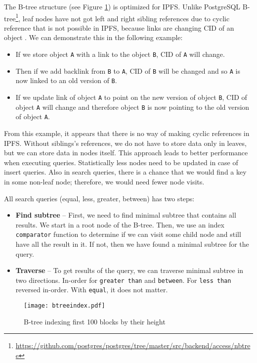 The B-tree structure (see Figure \ref{btree}) is optimized for IPFS. Unlike PostgreSQL B-tree\footnote{\url{https://github.com/postgres/postgres/tree/master/src/backend/access/nbtree}}, leaf nodes have not got left and right sibling references due to cyclic reference that is not possible in IPFS, because links are changing CID of an object \cite{stonebraker1986design}. We can demonstrate this in the following example:
\begin{itemize}
    \item If we store object \texttt{A} with a link to the object \texttt{B}, CID of \texttt{A} will change.
    \item Then if we add backlink from \texttt{B} to \texttt{A}, CID of \texttt{B} will be changed and so \texttt{A} is now linked to an old version of \texttt{B}.
    \item If we update link of object \texttt{A} to point on the new version of object \texttt{B}, CID of object \texttt{A} will change and therefore object \texttt{B} is now pointing to the old version of object \texttt{A}.
\end{itemize}
From this example, it appears that there is no way of making cyclic references in IPFS. Without siblings's references, we do not have to store data only in leaves, but we can store data in nodes itself. This approach leads to better performance when executing queries. Statistically less nodes need to be updated in case of insert queries. Also in search queries, there is a chance that we would find a key in some non-leaf node; therefore, we would need fewer node visits.

All search queries (equal, less, greater, between) has two steps:
\begin{itemize}
    \item \textbf{Find subtree} -- First, we need to find minimal subtree that contains all results. We start in a root node of the B-tree. Then, we use an index \texttt{comparator} function to determine if we can visit some child node and still have all the result in it. If not, then we have found a minimal subtree for the query.
    \item \textbf{Traverse} -- To get results of the query, we can traverse minimal subtree in two directions. In-order for \texttt{greater than} and \texttt{between}. For \texttt{less than} reversed in-order. With \texttt{equal}, it does not matter.
\end{itemize}

\begin{figure}[h]
    \centering
    \texttt{[image: btreeindex.pdf]}
    \caption{B-tree indexing first 100 blocks by their height}
    \label{btree}
\end{figure}

